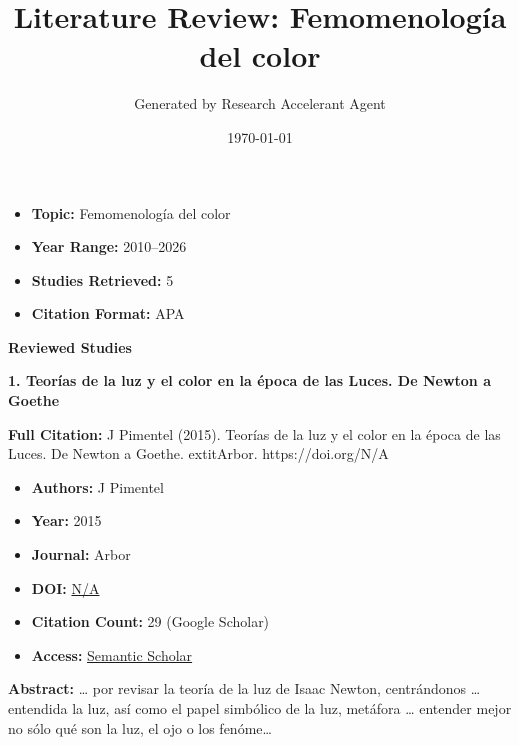 \documentclass[11pt,a4paper]{article}
\title{\textbf{Literature Review: Femomenología del color
}}
\author{Generated by Research Accelerant Agent}
\date{\today}
\begin{document}
\maketitle



\begin{resultbox}
\begin{itemize}[leftmargin=*]
    \item \textbf{Topic:} Femomenología del color

    \item \textbf{Year Range:} 2010--2026
    \item \textbf{Studies Retrieved:} 5
    \item \textbf{Citation Format:} APA
\end{itemize}
\end{resultbox}

\vspace{1em}

\textbf{\large Reviewed Studies}\par\vspace{0.5em}


\textbf{1. Teorías de la luz y el color en la época de las Luces. De Newton a Goethe}

\textbf{Full Citation:} J Pimentel (2015). Teorías de la luz y el color en la época de las Luces. De Newton a Goethe. 	extit{Arbor}. https://doi.org/N/A

\begin{resultbox}
\begin{itemize}[leftmargin=*]
    \item \textbf{Authors:} J Pimentel
    \item \textbf{Year:} 2015
    \item \textbf{Journal:} Arbor
    
    
    
    \item \textbf{DOI:} \href{https://doi.org/}{N/A}
    \item \textbf{Citation Count:} 29 (Google Scholar)
    \item \textbf{Access:} \href{https://arbor.revistas.csic.es/index.php/arbor/article/view/2067}{Semantic Scholar}
\end{itemize}
\end{resultbox}

\textbf{Abstract:} … por revisar la teoría de la luz de Isaac Newton, centrándonos … entendida la luz, así como el papel simbólico de la luz, metáfora … entender mejor no sólo qué son la luz, el ojo o los fenóme…\par\vspace{0.5em}
\end{document}
